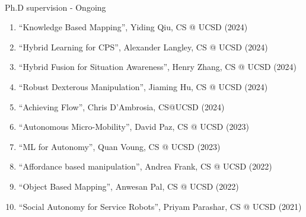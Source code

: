 \documentclass{article}
\begin{document}
\begin{cv}


\begin{cvlist}{~}

\item[Ph.D supervision - Ongoing]\ \\
  \begin{enumerate}
  \item ``Knowledge Based Mapping'', Yiding Qiu, CS @ UCSD (2024)
  \item ``Hybrid Learning for CPS'', Alexander Langley, CS @ UCSD (2024)
  \item ``Hybrid Fusion for Situation Awareness'', Henry Zhang, CS @  UCSD (2024)
  \item ``Robust Dexterous Manipulation'', Jiaming Hu, CS @ UCSD (2024)
  \item ``Achieving Flow'', Chris D'Ambrosia, CS@UCSD (2024)
  \item ``Autonomous Micro-Mobility'', David Paz, CS @ UCSD (2023)
  \item ``ML for Autonomy'', Quan Voung, CS @ UCSD (2023)
  \item ``Affordance based manipulation'', Andrea Frank, CS @ UCSD (2022)
  \item ``Object Based Mapping'', Anwesan Pal, CS @ UCSD (2022)
  \item ``Social Autonomy for Service Robots'', Priyam Parashar, CS @ UCSD (2021)
  \end{enumerate}


\end{cvlist}
\end{cv}
\end{document}
